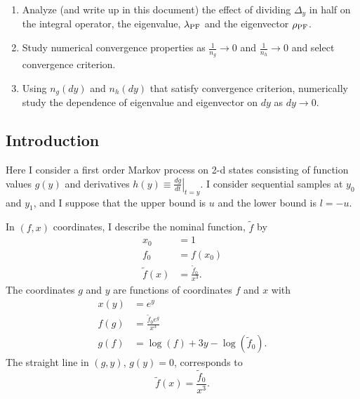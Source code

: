 \documentclass[]{article}
\newcommand\lambdaPF{\lambda_{\rm{PF}}} %
\newcommand\rhoPF{\rho_{\rm{PF}}} %
\begin{document}
\begin{enumerate}
\item Analyze (and write up in this document) the effect of dividing
  $\Delta_y$ in half on the integral operator, the eigenvalue,
  $\lambdaPF$ and the eigenvector $\rhoPF$.
\item Study numerical convergence properties as $\frac{1}{n_g}
  \rightarrow 0$ and $\frac{1}{n_h} \rightarrow 0$ and select
  convergence criterion.
\item Using $n_g(dy)$ and $n_h(dy)$ that satisfy convergence
  criterion, numerically study the dependence of eigenvalue and
  eigenvector on $dy$ as $dy \rightarrow 0$.
\end{enumerate}

\subsection{Introduction}
  \label{sec:introduction}

Here I consider a first order Markov process on 2-d states consisting
of function values $g(y)$ and derivatives $h(y) \equiv \left. \frac{d
    g }{d t} \right|_{t=y}$.  I consider sequential samples at $y_0$
and $y_1$, and I suppose that the upper bound is $u$ and the lower
bound is $l=-u$.

In $(f,x)$ coordinates, I describe the nominal function, $\tilde f$ by
\begin{align*}
  x_0 &= 1\\
  f_0 &= f(x_0) \\
  \tilde f(x) &= \frac{\tilde f_0}{x^3}.
\end{align*}
The coordinates $g$ and $y$ are functions of coordinates $f$ and $x$ with
\begin{align*}
  x(y) &= e^y \\
  f(g) &= \frac{\tilde f_0 e^{g}}{x^3} \\
  g(f) &= \log(f) + 3y - \log(\tilde f_0).
\end{align*}
The straight line in $(g,y)$, $g(y) = 0$, corresponds to
\begin{equation*}
  \tilde f(x) = \frac{\tilde f_0}{x^3}.
\end{equation*}
\end{document}

